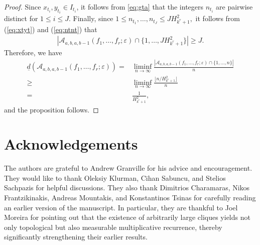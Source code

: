\documentclass[12pt, reqno, a4paper]{amsart}
\newtheorem{theorem}{Theorem}[section]
\theoremstyle{definition}
\newtheorem{definition}{Definition}[section]
\theoremstyle{remark}
\numberwithin{equation}{section}
\renewcommand{\leq}{\leqslant}
\renewcommand{\geq}{\geqslant}
\begin{document}
\begin{proof}
Since \( x_{t_i}, y_{t_i} \in I_{t_i} \), it follows from \eqref{eq:gta} that the integers \( n_{t_i} \) are pairwise distinct for \( 1 \leq i \leq J \). Finally, since
 $1 \leq n_{t_1},\ldots, n_{t_J} \leq JH_{k^r+1}^2,$
it follows from (\ref{eq:xtyt}) and (\ref{eq:ntnt}) that 
\begin{align*}
|\mathcal{A}_{a,b,a,b-1}(f_1, \ldots, f_r;\varepsilon) \cap \{1,\ldots,JH_{k^r+1}^2\}| \geq J. 
\end{align*}
Therefore, we have
     \begin{align*}
       \underline{d}(\mathcal{A}_{a,b,a,b-1}(f_1, \ldots, f_r;\varepsilon)) =&  \liminf_{n\to\infty} \frac{|\mathcal{A}_{a,b,a,b-1}(f_1, \ldots, f_r;\varepsilon)\cap\{1,\ldots,n\}|}{n} \\
       \geq & \liminf_{n\to\infty} \frac{\lfloor n/ H_{k^r+1}^2\rfloor}{n} \\
         = & \frac{1}{H_{k^r+1}^2},
     \end{align*}
    and the proposition follows.
\end{proof}







\section*{Acknowledgements}
The authors are grateful to Andrew Granville for his advice and encouragement. They would like to thank Oleksiy Klurman, Cihan Sabuncu, and Stelios Sachpazis for helpful discussions. They also thank Dimitrios Charamaras, Nikos Frantzikinakis, Andreas Mountakis, and Konstantinos Tsinas for carefully reading an earlier version of the manuscript. In particular, they are thankful to Joel Moreira for pointing out that the existence of arbitrarily large cliques yields not only topological but also measurable multiplicative recurrence, thereby significantly strengthening their earlier results.

\printbibliography

\end{document}
